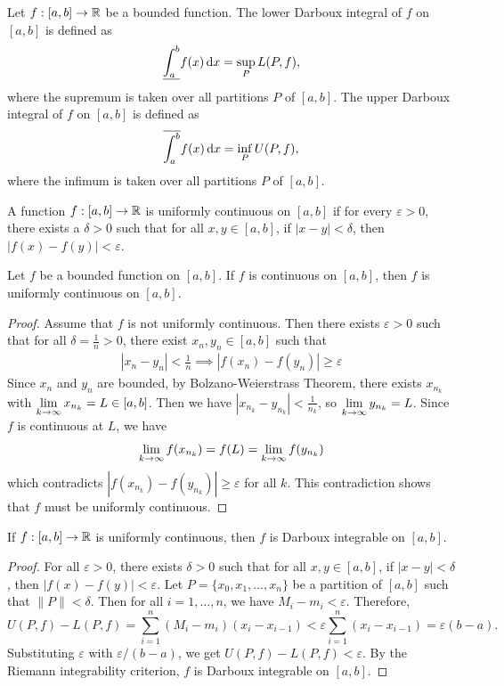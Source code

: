 \begin{definition} 
    Let $f:[a,b]\to\mathbb{R}$ be a bounded function. The lower Darboux integral of $f$ on $[a,b]$ is defined as
    \[
        \underline{\int_a^b} f(x) \operatorname*{d\!} x = \sup_{P} L(P,f),
    \]
    where the supremum is taken over all partitions $P$ of $[a,b]$. The upper Darboux integral of $f$ on $[a,b]$ is defined as
    \[
        \overline{\int_a^b} f(x) \operatorname*{d\!} x = \inf_{P} U(P,f),
    \]
    where the infimum is taken over all partitions $P$ of $[a,b]$.
\end{definition}

\begin{definition} 
    A function $f:[a,b]\to\mathbb{R}$ is uniformly continuous on $[a,b]$ if for every $\varepsilon > 0$, there exists a $\delta > 0$ such that for all $x,y \in [a,b]$, if $|x-y| < \delta$, then $|f(x) - f(y)| < \varepsilon$.
\end{definition}

\begin{theorem}
    Let $f$ be a bounded function on $[a,b]$. If $f$ is continuous on $[a,b]$, then $f$ is uniformly continuous on $[a,b]$.
\end{theorem}
\begin{proof}
    Assume that $f$ is not uniformly continuous. Then there exists $\varepsilon>0$ such that for all $\delta=\frac{1}{n}>0$, there exist $x_n,y_n\in [a,b]$ such that 
    \begin{align*}
        |x_n-y_n|<\frac{1}{n} \implies |f(x_n) - f(y_n)| \ge \varepsilon
    \end{align*}
    Since $x_n$ and $y_n$ are bounded, by Bolzano-Weierstrass Theorem, there exists $x_{n_k}$ with $\lim\limits_{k\to\infty}x_{n_k} = L\in[a,b]$. Then we have $|x_{n_k}-y_{n_k}|<\frac{1}{n_k}$, so $\lim\limits_{k\to\infty}y_{n_k} = L$. Since $f$ is continuous at $L$, we have 
    \[\lim\limits_{k\to\infty}f(x_{n_k}) = f(L) = \lim\limits_{k\to\infty}f(y_{n_k})\] which contradicts $|f(x_{n_k}) - f(y_{n_k})| \ge \varepsilon$ for all $k$. This contradiction shows that $f$ must be uniformly continuous.
\end{proof}

\begin{theorem}
    If $f:[a,b]\to\mathbb{R}$ is uniformly continuous, then $f$ is Darboux integrable on $[a,b]$.
\end{theorem}
\begin{proof}
    For all $\varepsilon>0$, there exists $\delta>0$ such that for all $x,y\in[a,b]$, if $|x-y|<\delta$, then $|f(x)-f(y)|<\varepsilon$. Let $P = \{x_0,x_1,...,x_n\}$ be a partition of $[a,b]$ such that $\|P\|<\delta$. Then for all $i=1,...,n$, we have $M_i - m_i < \varepsilon$. Therefore,
    \[
        U(P,f) - L(P,f) = \sum_{i=1}^n (M_i - m_i)(x_i - x_{i-1}) < \varepsilon \sum_{i=1}^n (x_i - x_{i-1}) = \varepsilon(b-a).
    \]
    Substituting $\varepsilon$ with $\varepsilon/(b-a)$, we get $U(P,f) - L(P,f) < \varepsilon$. By the Riemann integrability criterion, $f$ is Darboux integrable on $[a,b]$.
\end{proof}

